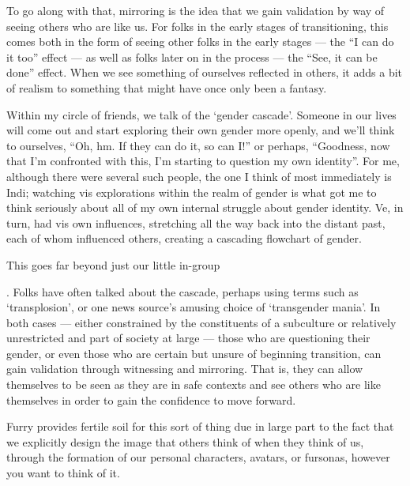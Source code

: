 To go along with that, mirroring is the idea that we gain validation by way of seeing others who are like us. For folks in the early stages of transitioning, this comes both in the form of seeing other folks in the early stages --- the ``I can do it too'' effect --- as well as folks later on in the process --- the ``See, it can be done'' effect. When we see something of ourselves reflected in others, it adds a bit of realism to something that might have once only been a fantasy.

Within my circle of friends, we talk of the `gender cascade'. Someone in our lives will come out and start exploring their own gender more openly, and we'll think to ourselves, ``Oh, hm. If they can do it, so can I!'' or perhaps, ``Goodness, now that I'm confronted with this, I'm starting to question my own identity''. For me, although there were several such people, the one I think of most immediately is Indi; watching vis explorations within the realm of gender is what got me to think seriously about all of my own internal struggle about gender identity. Ve, in turn, had vis own influences, stretching all the way back into the distant past, each of whom influenced others, creating a cascading flowchart of gender.


This goes far beyond just our little in-group. Folks have often talked about the cascade, perhaps using terms such as `transplosion', or one news source's amusing choice of `transgender mania'. In both cases --- either constrained by the constituents of a subculture or relatively unrestricted and part of society at large --- those who are questioning their gender, or even those who are certain but unsure of beginning transition, can gain validation through witnessing and mirroring. That is, they can allow themselves to be seen as they are in safe contexts and see others who are like themselves in order to gain the confidence to move forward.

Furry provides fertile soil for this sort of thing due in large part to the fact that we explicitly design the image that others think of when they think of us, through the formation of our personal characters, avatars, or fursonas, however you want to think of it.

